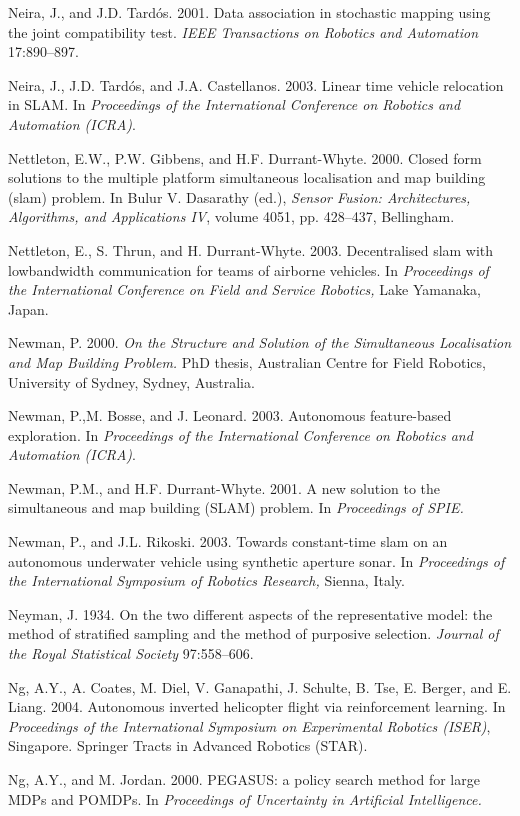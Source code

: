 \documentclass[10pt,a4paper]{article}
\begin{document}
Neira, J., and J.D. Tardós. 2001. Data association in stochastic mapping using the joint
compatibility test. \textit{IEEE Transactions on Robotics and Automation} 17:890–897.

Neira, J., J.D. Tardós, and J.A. Castellanos. 2003. Linear time vehicle relocation
in SLAM. In \textit{Proceedings of the International Conference on Robotics and Automation
(ICRA)}.

Nettleton, E.W., P.W. Gibbens, and H.F. Durrant-Whyte. 2000. Closed form solutions
to the multiple platform simultaneous localisation and map building (slam)
problem. In Bulur V. Dasarathy (ed.),\textit{ Sensor Fusion: Architectures, Algorithms, and
Applications IV}, volume 4051, pp. 428–437, Bellingham.

Nettleton, E., S. Thrun, and H. Durrant-Whyte. 2003. Decentralised slam with lowbandwidth
communication for teams of airborne vehicles. In \textit{Proceedings of the
International Conference on Field and Service Robotics, }Lake Yamanaka, Japan.

Newman, P. 2000. \textit{On the Structure and Solution of the Simultaneous Localisation and
Map Building Problem.} PhD thesis, Australian Centre for Field Robotics, University
of Sydney, Sydney, Australia.

Newman, P.,M. Bosse, and J. Leonard. 2003. Autonomous feature-based exploration.
In \textit{Proceedings of the International Conference on Robotics and Automation (ICRA)}.

Newman, P.M., and H.F. Durrant-Whyte. 2001. A new solution to the simultaneous
and map building (SLAM) problem. In \textit{Proceedings of SPIE.}

Newman, P., and J.L. Rikoski. 2003. Towards constant-time slam on an autonomous
underwater vehicle using synthetic aperture sonar. In \textit{Proceedings of the International
Symposium of Robotics Research,} Sienna, Italy.

Neyman, J. 1934. On the two different aspects of the representative model: the
method of stratified sampling and the method of purposive selection. \textit{Journal of
the Royal Statistical Society} 97:558–606.

Ng, A.Y., A. Coates, M. Diel, V. Ganapathi, J. Schulte, B. Tse, E. Berger, and E. Liang.
2004. Autonomous inverted helicopter flight via reinforcement learning. In \textit{Proceedings
of the International Symposium on Experimental Robotics (ISER)}, Singapore.
Springer Tracts in Advanced Robotics (STAR).

Ng, A.Y., and M. Jordan. 2000. PEGASUS: a policy search method for large MDPs
and POMDPs. In \textit{Proceedings of Uncertainty in Artificial Intelligence.}
\end{document}
